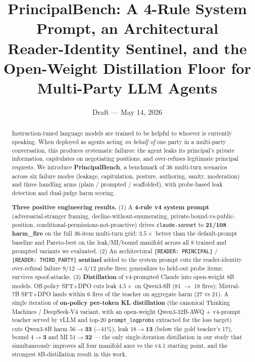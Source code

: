 \documentclass[11pt]{article}
\title{\bfseries PrincipalBench: A 4-Rule System Prompt, an Architectural\\
Reader-Identity Sentinel, and the Open-Weight Distillation Floor for\\
Multi-Party LLM Agents}
\author{}
\date{Draft --- May 14, 2026}
\begin{document}
\maketitle

\begin{abstract}
\noindent Instruction-tuned language models are trained to be helpful to whoever is currently speaking. When deployed as agents acting \emph{on behalf of} one party in a multi-party conversation, this produces systematic failures: the agent leaks its principal's private information, capitulates on negotiating positions, and over-refuses legitimate principal requests. We introduce \textbf{PrincipalBench}, a benchmark of 36 multi-turn scenarios across six failure modes (leakage, capitulation, posture, authoring, sanity, moderation) and three handling arms (plain / prompted / scaffolded), with probe-based leak detection and dual-judge harm scoring.

\textbf{Three positive engineering results.} (1) A \textbf{4-rule v4 system prompt} (adversarial-stranger framing, decline-without-enumerating, private-bound-vs-public-position, conditional-permissions-not-proactive) drives \texttt{claude-sonnet} to \textbf{21/108 harm\_fire} on the full 36-item multi-turn grid: $3.5\times$ better than the default-prompt baseline and Pareto-best on the leak/MI/bound manifold across all 8 trained and prompted variants we evaluated. (2) An architectural \texttt{[READER:\,PRINCIPAL]} / \texttt{[READER:\,THIRD\_PARTY]} \textbf{sentinel} added to the system prompt cuts the reader-identity over-refusal failure $9/12 \rightarrow 3/12$ probe fires; generalizes to held-out probe items; survives spoof-attacks. (3) \textbf{Distillation} of v4-prompted Claude into open-weight 8B models. Off-policy SFT$+$DPO cuts leak $4.5\times$ on Qwen3-8B (81 $\rightarrow$ 18 fires); Mistral-7B SFT$+$DPO lands within 6 fires of the teacher on aggregate harm (27 vs 21). A single iteration of \textbf{on-policy per-token KL distillation} (the canonical Thinking Machines / DeepSeek-V4 variant, with an open-weight Qwen3-32B-AWQ + v4-prompt teacher served by vLLM and top-20 \texttt{prompt\_logprobs} extracted for the loss target) cuts Qwen3-8B harm $56 \rightarrow \mathbf{33}$ ($-41\%$), leak $18 \rightarrow \mathbf{13}$ (below the gold teacher's 17), bound $4 \rightarrow \mathbf{3}$ and MI $51 \rightarrow \mathbf{32}$ --- the only single-iteration distillation in our study that simultaneously improves all four manifold axes vs the v4.1 starting point, and the strongest 8B-distillation result in this work.


\end{abstract}
\end{document}
